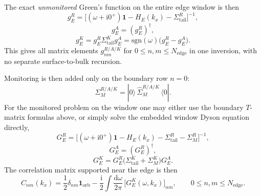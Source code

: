 \documentclass[11pt]{article}
\newcommand{\ii}{\mathrm{i}}
\newcommand{\rd}{\mathrm{d}}
\newcommand{\sgn}{\mathrm{sgn}}
\newcommand{\Id}{\mathbf{1}}
\begin{document}
The exact \emph{unmonitored} Green's function on the entire edge window is then
\begin{equation}
  g_E^{R}
  =
  \Big[
    (\omega+\ii 0^+)\Id
    - H_E(k_x)
    - \Sigma_{\mathrm{tail}}^{R}
  \Big]^{-1},
\end{equation}
\begin{equation}
  g_E^{A}=(g_E^{R})^\dagger,
\end{equation}
\begin{equation}
  g_E^{K}
  =
  g_E^{R}\Sigma_{\mathrm{tail}}^{K}g_E^{A}
  =
  \sgn(\omega)\Big(g_E^{R}-g_E^{A}\Big).
\end{equation}
This gives all matrix elements \(g_{nm}^{R/A/K}\) for \(0\le n,m\le
N_{\mathrm{edge}}\) in one inversion, with no separate surface-to-bulk
recursion.

Monitoring is then added only on the boundary row \(n=0\):
\begin{equation}
  \Sigma_M^{R/A/K}
  =
  |0\rangle\,\hat\Sigma_M^{R/A/K}\,\langle 0|.
\end{equation}
For the monitored problem on the window one may either use the boundary
\(T\)-matrix formulas above, or simply solve the embedded window Dyson equation
directly,
\begin{equation}
  G_E^{R}
  =
  \Big[
    (\omega+\ii 0^+)\Id
    - H_E(k_x)
    - \Sigma_{\mathrm{tail}}^{R}
    - \Sigma_M^{R}
  \Big]^{-1},
\end{equation}
\begin{equation}
  G_E^{A}=(G_E^{R})^\dagger,
\end{equation}
\begin{equation}
  G_E^{K}
  =
  G_E^{R}\Big(
    \Sigma_{\mathrm{tail}}^{K}
    +
    \Sigma_M^{K}
  \Big)G_E^{A}.
\end{equation}
The correlation matrix supported near the edge is then
\begin{equation}
  C_{nm}(k_x)
  =
  \frac{1}{2}\delta_{nm}\Id_{\mathrm{orb}}
  - \frac{\ii}{2}\int\frac{\rd\omega}{2\pi}\,
  \bigl[G_E^{K}(\omega,k_x)\bigr]_{nm},
  \qquad 0\le n,m\le N_{\mathrm{edge}}.
\end{equation}
\end{document}
